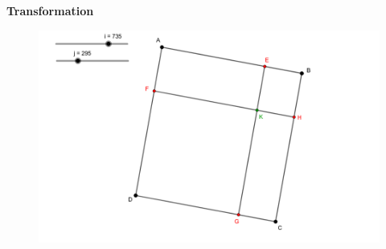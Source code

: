 \documentclass{beamer}
\begin{document}
\begin{frame}[t]
\begin{columns}[t]
\begin{column}{.5\linewidth}

                \begin{block}{\centering \textbf{Transformation}}
                    \begin{figure}[t]
                        \includegraphics[width=.5\linewidth]{rsc/transform_formula.png}\\
                    \end{figure}
                \end{block}



\end{column}
\end{columns}
\end{frame}
\end{document}
